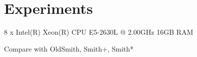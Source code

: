 {
\abnormalparskip{0pt}
\chapter{Experiments}
\label{cha:experiments}
}

8 x Intel(R) Xeon(R) CPU E5-2630L @ 2.00GHz
16GB RAM

Compare with OldSmith, Smith+, Smith*

\chapterbreak{}

